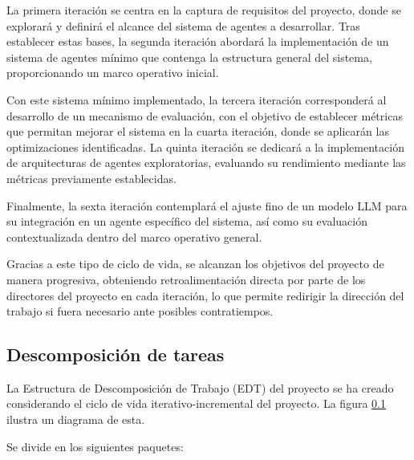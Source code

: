 La primera iteración se centra en la captura de requisitos del proyecto, donde se explorará y definirá el alcance del sistema de agentes a desarrollar. Tras establecer estas bases, la segunda iteración abordará la implementación de un sistema de agentes mínimo que contenga la estructura general del sistema, proporcionando un marco operativo inicial.

Con este sistema mínimo implementado, la tercera iteración corresponderá al desarrollo de un mecanismo de evaluación, con el objetivo de establecer métricas que permitan mejorar el sistema en la cuarta iteración, donde se aplicarán las optimizaciones identificadas. La quinta iteración se dedicará a la implementación de arquitecturas de agentes exploratorias, evaluando su rendimiento mediante las métricas previamente establecidas.

Finalmente, la sexta iteración contemplará el ajuste fino de un modelo LLM para su integración en un agente específico del sistema, así como su evaluación contextualizada dentro del marco operativo general.

Gracias a este tipo de ciclo de vida, se alcanzan los objetivos del proyecto de manera progresiva, obteniendo retroalimentación directa por parte de los directores del proyecto en cada iteración, lo que permite redirigir la dirección del trabajo si fuera necesario ante posibles contratiempos.

\subsection{Descomposición de tareas}
La Estructura de Descomposición de Trabajo (EDT) del proyecto se ha creado considerando el ciclo de vida iterativo-incremental del proyecto. La figura \ref{} ilustra un diagrama de esta. 

Se divide en los siguientes paquetes:

